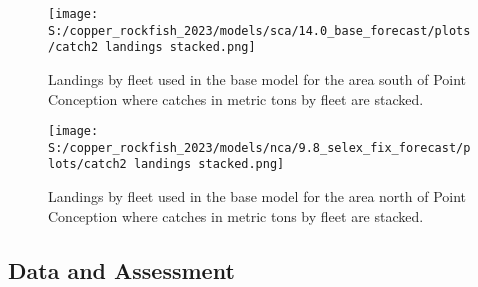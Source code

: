 \documentclass[11pt,
  english,
  letterpaper,
]{article}
\begin{document}
\begin{figure}
\centering
\texttt{[image: S:/copper\_rockfish\_2023/models/sca/14.0\_base\_forecast/plots/catch2 landings stacked.png]}
\caption{Landings by fleet used in the base model for the area south of Point Conception where catches in metric tons by fleet are stacked.\label{fig:es-south-catch}}
\end{figure}

\begin{figure}
\centering
\texttt{[image: S:/copper\_rockfish\_2023/models/nca/9.8\_selex\_fix\_forecast/plots/catch2 landings stacked.png]}
\caption{Landings by fleet used in the base model for the area north of Point Conception where catches in metric tons by fleet are stacked.\label{fig:es-north-catch}}
\end{figure}

\pagebreak

\hypertarget{data-and-assessment}{%
\subsection*{Data and Assessment}\label{data-and-assessment}}
\end{document}
